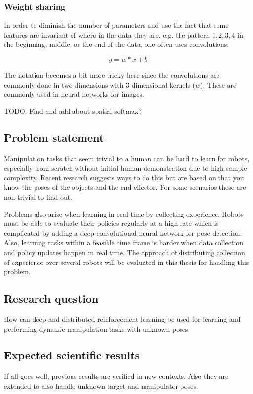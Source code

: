 \subsubsection{Weight sharing}
In order to diminish the number of parameters and use the fact that some features are invariant of where in the data they are,
e.g. the pattern $1, 2, 3, 4$ in the beginning, middle, or the end of the data, one often uses convolutions:

\begin{equation}
    y = w * x + b
\end{equation}

The notation becomes a bit more tricky here since the convolutions are commonly done in two dimensions with
3-dimensional kernels ($w$). These are commonly used in neural networks for images.

TODO: Find and add about spatial softmax?

\subsection{Problem statement}

Manipulation tasks that seem trivial to a human can be hard to learn for
robots, especially from scratch without initial human demonstration due to high
sample complexity. Recent research suggests ways to do this but are based on
that you know the poses of the objects and the end-effector. For some scenarios
these are non-trivial to find out.

Problems also arise when learning in real time by collecting experience. Robots
must be able to evaluate their policies regularly at a high rate which is
complicated by adding a deep convolutional neural network for pose detection.
Also, learning tasks within a feasible time frame is harder when data
collection and policy updates happen in real time. The approach of
distributing collection of experience over several robots will be evaluated in
this thesis for handling this problem.

\subsection{Research question}

How can deep and distributed reinforcement learning be used for learning and
performing dynamic manipulation tasks with unknown poses.

\subsection{Expected scientific results}

If all goes well, previous results are verified in new contexts. Also
they are extended to also handle unknown target and manipulator poses.
